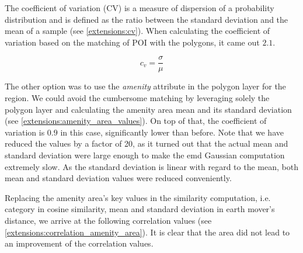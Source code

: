 {The coefficient of variation (CV) is a measure of dispersion of a probability distribution and is defined as the ratio between the standard deviation and the mean of a sample (see \autoref{extensions:cv}). When calculating the coefficient of variation based on the matching of POI with the polygons, it came out $2.1$.

\begin{equation}
c_v = \frac{\sigma}{\mu} 
\label{extensions:cv}
\end{equation}

The other option was to use the \textit{amenity} attribute in the polygon layer for the region. We could avoid the cumbersome matching by leveraging solely the polygon layer and calculating the amenity area mean and its standard deviation (see \autoref{extensions:amenity_area_values}). On top of that, the coefficient of variation is $0.9$ in this case, significantly lower than before. Note that we have reduced the values by a factor of 20, as it turned out that the actual mean and standard deviation were large enough to make the emd Gaussian computation extremely slow. As the standard deviation is linear with regard to the mean, both mean and standard deviation values were reduced conveniently. 

Replacing the amenity area's key values in the similarity computation, i.e. category in cosine similarity, mean and standard deviation in earth mover's distance, we arrive at the following correlation values (see \autoref{extensions:correlation_amenity_area}). It is clear that the area did not lead to an improvement of the correlation values.

}
